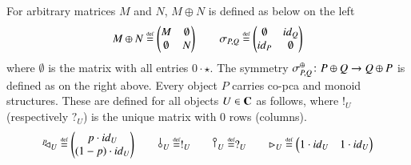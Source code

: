 %
%
For arbitrary matrices $M$ and $N$, $M\oplus N$ is defined as below on the left
\begin{equation}\label{eq:matsmc}
M \piu N \defeq \begin{pmatrix}
    M & \emptyset\\
    \emptyset & N
\end{pmatrix}
\qquad
\symm{P}{Q}\defeq \begin{pmatrix}
    \emptyset & \id{Q}\\
    \id{P} & \emptyset
\end{pmatrix}
\end{equation}
where $\emptyset$ is the matrix with all entries $ 0\cdot \star$. The symmetry $\symmp{P}{Q}\colon P\oplus Q \to Q \oplus P$ is defined as on the right above. %
%
%
%
%
% 
%
%
Every object $P$ carries co-pca and monoid structures. These are defined for all objects $U\in \mathbf{C}$ as follows, where $!_U$ (respectively $?_U$) is the unique matrix with $0$ rows (columns).
\begin{equation}\label{eq:matmonpca}
\diagp{U}\defeq\begin{pmatrix}
    p\cdot \id{U} \\
    (1-p)\cdot \id{U}
\end{pmatrix}
\qquad
\bang{U}\defeq !_U
\qquad 
\cobang{U}\defeq ?_U
\qquad
\codiag{U}\defeq \begin{pmatrix}
    1\cdot \id{U} & 1\cdot \id{U}
\end{pmatrix} 
\end{equation}
